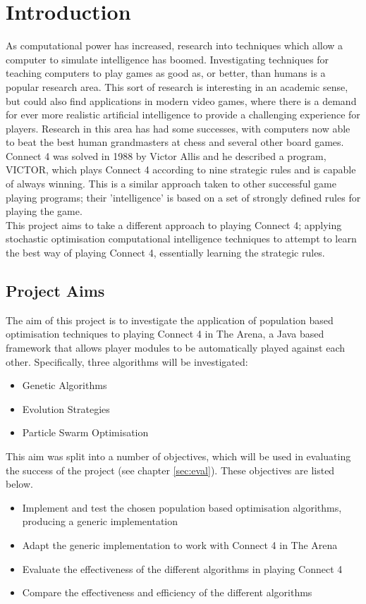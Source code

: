 \chapter{Introduction}

As computational power has increased, research into techniques which allow a computer to simulate intelligence has boomed. Investigating techniques for teaching computers to play games as good as, or better, than humans is a popular research area. This sort of research is interesting in an academic sense, but could also find applications in modern video games, where there is a demand for ever more realistic artificial intelligence to provide a challenging experience for players. Research in this area has had some successes, with computers now able to beat the best human grandmasters at chess and several other board games.
\\Connect 4 was solved in 1988 by Victor Allis and he described a program, VICTOR, which plays Connect 4 according to nine strategic rules and is capable of always winning\cite{connect4}. This is a similar approach taken to other successful game playing programs; their 'intelligence' is based on a set of strongly defined rules for playing the game.
\\This project aims to take a different approach to playing Connect 4; applying stochastic optimisation computational intelligence techniques to attempt to learn the best way of playing Connect 4, essentially learning the strategic rules.

\section{Project Aims}
The aim of this project is to investigate the application of population based optimisation techniques to playing Connect 4 in The Arena, a Java based framework that allows player modules to be automatically played against each other.
Specifically, three algorithms will be investigated: 
\begin{itemize}
\item {Genetic Algorithms}
\item {Evolution Strategies}
\item {Particle Swarm Optimisation}
\end{itemize}

This aim was split into a number of objectives, which will be used in evaluating the success of the project (see chapter \ref{sec:eval}).
These objectives are listed below.
\begin{itemize}
\item {Implement and test the chosen population based optimisation algorithms, producing a generic implementation}
\item {Adapt the generic implementation to work with Connect 4 in The Arena}
\item {Evaluate the effectiveness of the different algorithms in playing Connect 4}
\item {Compare the effectiveness and efficiency of the different algorithms}
\end{itemize}

